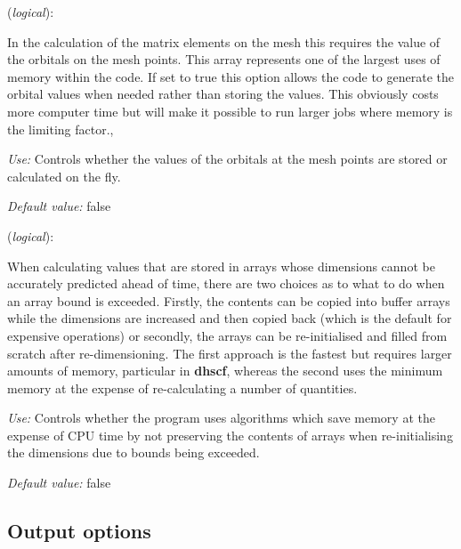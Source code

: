\begin{description}
\itemsep 10pt
\parsep 0pt

\item[{\bf DirectPhi}] ({\it logical}):

In the calculation of the matrix elements on the mesh this requires the
value of the orbitals on the mesh points. This array represents one of
the largest uses of memory within the code. If set to true this option
allows the code to generate the orbital values when needed rather than
storing the values. This obviously costs more computer time but will
make it possible to run larger jobs where memory is the limiting factor.,

{\it Use:} Controls whether the values of the orbitals at the mesh points
  are stored or calculated on the fly.

{\it Default value:}  false

\item[{\bf SaveMemory}] ({\it logical}):

When calculating values that are stored in arrays whose dimensions
cannot be accurately predicted ahead of time, there are two choices
as to what to do when an array bound is exceeded. Firstly, the
contents can be copied into buffer arrays while the dimensions
are increased and then copied back (which is the default for
expensive operations) or secondly, the arrays can be re-initialised
and filled from scratch after re-dimensioning. The first approach
is the fastest but requires larger amounts of memory, particular
in {\bf dhscf}, whereas the second uses the minimum memory at the
expense of re-calculating a number of quantities.

{\it Use:} Controls whether the program uses algorithms which save memory
  at the expense of CPU time by not preserving the contents of arrays
  when re-initialising the dimensions due to bounds being exceeded. 

{\it Default value:}  false

\end{description}


\vspace{5pt}
\subsection{Output options}

